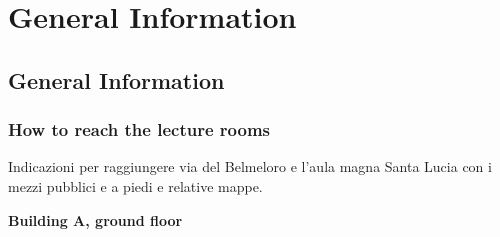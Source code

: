 \documentclass[10pt, a4paper]{book}
\begin{document}
\pagestyle{fancy} %







\part{General Information}




\chapter*{General Information}



\section*{How to reach the lecture rooms}
Indicazioni per raggiungere via del Belmeloro e l'aula magna Santa Lucia con i mezzi pubblici e a piedi e relative mappe. 
\begin{center}
\textbf{Building A, ground floor}
\end{center}
\end{document}

